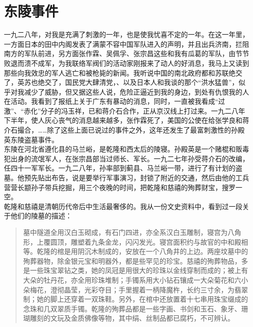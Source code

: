 \fancyhead[RO]{} %
\fancyhead[LE]{} %
\chapter*{东陵事件}
\thispagestyle{empty}
一九二八年，对我是充满了刺激的一年，也是使我忧喜不定的一年。在这一年里，一方面日本的田中内阁发表了满蒙不容中国军队进入的声明，并且出兵济南，拦阻南方的军队前进，另方面张作霖、吴佩孚、张宗昌这些和我有瓜葛的军队，由节节败退而溃不成军，为我联络军阀们的活动家刚报来了动人的好消息，我马上又读到那些向我效忠的军人逃亡和被枪毙的新闻。我听说中国的南北政府都和苏联绝交了，英苏也绝交了，国民党大肆清党，、以及日本人和我谈的那个“洪水猛兽”，似乎对我减少了威胁，但又据这些人说，危险正逼近到我的身边，到处有仇恨我的人在活动。我看到了报纸上关于广东有暴动的消息，同时，一直被我看成“过激”、“赤化”分子的冯玉祥，已和蒋介石合作，正从京汉线上打过来。一九二八年下半年，使人灰心丧气的消息越来越多，张作霖死了，美国的公使在给张学良和蒋介石撮合，……除了这些上面已说过的事件之外，这年还发生了最富刺激性的孙殿英东陵盗墓事件。\\

东陵在河北省遵化县的马兰峪，是乾隆和西太后的陵寝。孙殿英是一个赌棍和贩毒犯出身的流氓军人，在张宗昌部当过师长、军长。一九二七年孙受蒋介石的改编，任四十一军军长。一九二八年，孙率部到蓟县、马兰峪一带，进行了有计划的盗墓。他预先贴出布告，说是要举行军事演习，封锁了附近的交通，然后由他的工兵营营长颛孙子带兵挖掘，用三个夜晚的时间，把乾隆和慈禧的殉葬财宝，搜罗一空。\\

乾隆和慈禧是清朝历代帝后中生活最奢侈的。我从一份文史资料中，看到过一段关于他们的陵墓的描述：\\

\begin{quote}
	墓中隧道全用汉白玉砌成，有石门四进，亦全系汉白玉雕制，寝宫为八角形，上覆圆顶，雕塑着九条金龙，闪闪发光。寝宫面积约与故官的中和殿相等。乾隆的棺是用阴沉木制成的，安放在一个八角井的上边。两座坟墓中的殉葬器物，除金银元宝和明器外，都是些罕见的珍宝。慈禧的殉葬物品，多是一些珠宝翠钻之类，她的凤冠是用很大的珍珠以金线穿制而成的；被上有大朵的牡丹花，亦全用珍珠堆制；手镯系用大小钻石镶成一大朵菊花和六小朵梅花，澄彻晶莹，光彩夺目；手里握着一柄降魔杵，长约三寸余，为翡翠制；她的脚上还穿着一双珠鞋。另外，在棺中还放置着十七串用珠宝缀成的念珠和几双翠质手镯。乾隆的殉葬品都是一些字画、书剑和玉石、象牙、珊瑚雕刻的文玩及金质佛像等物，其中绢、丝制品都已腐朽，不可辨认。\\
\end{quote}

